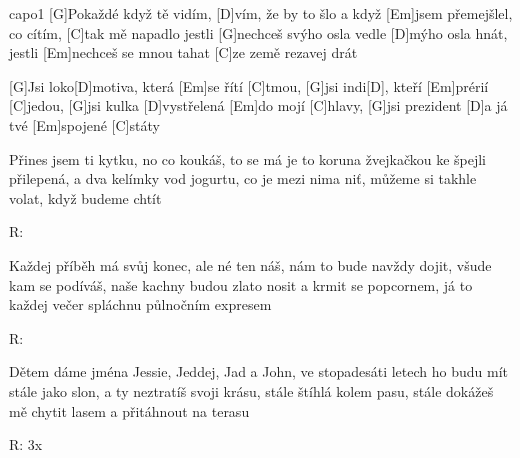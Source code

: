 \hfill capo1
[G]Pokaždé když tě vidím, [D]vím, že by to šlo
a když [Em]jsem přemejšlel, co cítím, [C]tak mě napadlo
jestli [G]nechceš svýho osla vedle [D]mýho osla hnát,
jestli [Em]nechceš se mnou tahat [C]ze země rezavej drát

[G]Jsi loko[D]motiva, která [Em]se řítí [C]tmou,
[G]jsi indi[D], kteří [Em]prérií [C]jedou,
[G]jsi kulka [D]vystřelená [Em]do mojí [C]hlavy,
[G]jsi prezident [D]a já tvé [Em]spojené [C]státy

Přines jsem ti kytku, no co koukáš, to se má
je to koruna žvejkačkou ke špejli přilepená,
a dva kelímky vod jogurtu, co je mezi nima niť,
můžeme si takhle volat, když budeme chtít

R:

Každej příběh má svůj konec, ale né ten náš,
nám to bude navždy dojit, všude kam se podíváš,
naše kachny budou zlato nosit a krmit se popcornem,
já to každej večer spláchnu půlnočním expresem

R:

Dětem dáme jména Jessie, Jeddej, Jad a John,
ve stopadesáti letech ho budu mít stále jako slon,
a ty neztratíš svoji krásu, stále štíhlá kolem pasu,
stále dokážeš mě chytit lasem a přitáhnout na terasu

R: 3x




